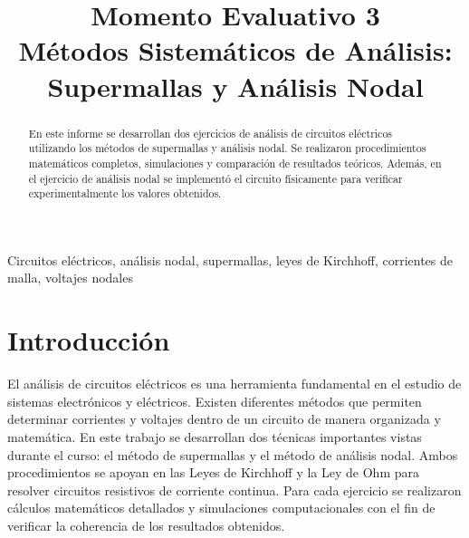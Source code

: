 \documentclass[conference]{IEEEtran}
\begin{document}
\title{Momento Evaluativo 3\\
Métodos Sistemáticos de Análisis:\\
Supermallas y Análisis Nodal}

\author{



\and



\and



}

\maketitle

\begin{abstract}
En este informe se desarrollan dos ejercicios de análisis de circuitos eléctricos utilizando los 
métodos de supermallas y análisis nodal. Se realizaron procedimientos matemáticos completos, 
simulaciones y comparación de resultados teóricos. Además, en el ejercicio de análisis nodal se 
implementó el circuito físicamente para verificar experimentalmente los valores obtenidos.
\end{abstract}

\begin{IEEEkeywords}
Circuitos eléctricos, análisis nodal, supermallas, leyes de Kirchhoff, 
corrientes de malla, voltajes nodales
\end{IEEEkeywords}

\section{Introducción}
El análisis de circuitos eléctricos es una herramienta fundamental en el estudio de sistemas 
electrónicos y eléctricos. Existen diferentes métodos que permiten determinar corrientes y voltajes 
dentro de un circuito de manera organizada y matemática.
En este trabajo se desarrollan dos técnicas importantes vistas durante el curso: el método de 
supermallas y el método de análisis nodal. Ambos procedimientos se apoyan en las Leyes de Kirchhoff 
y la Ley de Ohm para resolver circuitos resistivos de corriente continua.
Para cada ejercicio se realizaron cálculos matemáticos detallados y simulaciones computacionales con 
el fin de verificar la coherencia de los resultados obtenidos.
\end{document}
